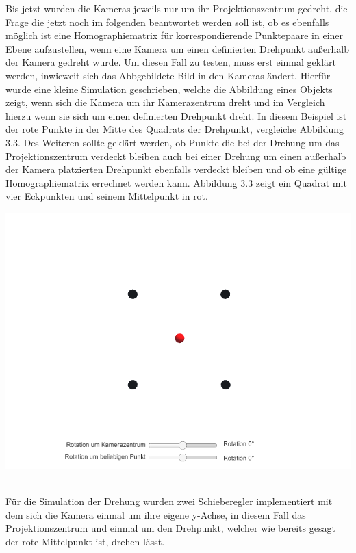 Bis jetzt wurden die Kameras jeweils nur um ihr Projektionszentrum gedreht, die Frage die jetzt noch im folgenden beantwortet werden soll ist, ob es ebenfalls möglich ist eine Homographiematrix für korrespondierende Punktepaare in einer Ebene aufzustellen, wenn eine Kamera um einen definierten Drehpunkt außerhalb der Kamera gedreht wurde. Um diesen Fall zu testen, muss erst einmal geklärt werden, inwieweit sich das Abbgebildete Bild in den Kameras ändert. Hierfür wurde eine kleine Simulation geschrieben, welche die Abbildung eines Objekts zeigt, wenn sich die Kamera um ihr Kamerazentrum dreht und im Vergleich hierzu wenn sie sich um einen definierten Drehpunkt dreht. In diesem Beispiel ist der rote Punkte in der Mitte des Quadrats der Drehpunkt, vergleiche Abbildung 3.3. Des Weiteren sollte geklärt werden, ob Punkte die bei der Drehung um das Projektionszentrum verdeckt bleiben auch bei einer Drehung um einen außerhalb der Kamera platzierten Drehpunkt ebenfalls verdeckt bleiben und ob eine gültige Homographiematrix errechnet werden kann. Abbildung 3.3 zeigt ein Quadrat mit vier Eckpunkten und seinem Mittelpunkt in rot.

\begin{minipage}{\linewidth}
	\centering
	\includegraphics[width=.8\linewidth]{images/Ausgangslage.png}
\end{minipage}\\


Für die Simulation der Drehung wurden zwei Schieberegler implementiert mit dem sich die Kamera einmal um ihre eigene y-Achse, in diesem Fall das Projektionszentrum und einmal um den Drehpunkt, welcher wie bereits gesagt der rote Mittelpunkt ist, drehen lässt.


